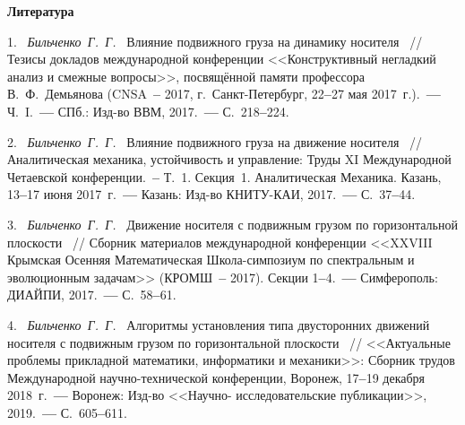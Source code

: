 \smallskip \centerline {\bf Литература} \nopagebreak



1.~%
\textit%
{Бильченко~Г.~Г.~}
{%
  {Влияние  подвижного  груза
  на  динамику  носителя}%
~/$\!$/
  Тезисы  докладов  международной  конференции
  <<Конструктивный  негладкий  анализ
  и  смежные  вопросы>>,
  посвящённой  памяти  профессора
  В.~Ф.~Демьянова
  (CNSA~{\textbf{--}}  2017,
  г.~Санкт-Петербург,
  22{\textbf{--}}27
  мая  2017~г.).~{\textbf{---}}
  Ч.~I.~{\textbf{---}}
  СПб.:  Изд-во  ВВМ,
  2017.~{\textbf{---}}
  С.~218{\textbf{--}}224.%
  }



2.~%
\textit%
{Бильченко~Г.~Г.~}
{%
  {Влияние  подвижного  груза
  на  движение  носителя}%
~/$\!$/
  Аналитическая  механика,
  устойчивость  и  управление:
  Труды  XI  Международной
  Четаевской  конференции.~{\textbf{--}}
  Т.~1.
  Секция~1.
  Аналитическая  Механика.
  Казань,
  13{\textbf{--}}17
  июня  2017~г.~{\textbf{---}}
  Казань:  Изд-во  КНИТУ-КАИ,
  2017.~{\textbf{---}}
  С.~37{\textbf{--}}44.%
  }



3.~%
\textit%
{Бильченко~Г.~Г.~}
{%
  {Движение  носителя  с  подвижным  грузом
  по  горизонтальной  плоскости}%
~/$\!$/
  Сборник  материалов  международной  конференции
  <<XXVIII  Крымская  Осенняя
  Математическая  Школа-симпозиум
  по  спектральным  и  эволюционным  задачам>>
  (КРОМШ~{\textbf{--}} 2017).
  Секции
  1{\textbf{--}}4.~{\textbf{---}}
  Симферополь:  ДИАЙПИ,
  2017.~{\textbf{---}}
  С.~58{\textbf{--}}61.%
  }



4.~%
\textit%
{Бильченко~Г.~Г.~}
{%
  {Алгоритмы
  установления  типа
  двусторонних  движений  носителя
  с  подвижным  грузом
  по  горизонтальной  плоскости}%
~/$\!$/
  <<Актуальные  проблемы
  прикладной  математики,  информатики
  и  механики>>:
  Сборник  трудов  Международной
  научно-технической  конференции,
  Воронеж,
  17{\textbf{--}}19
  декабря  2018~г.~{\textbf{---}}
  Воронеж:
  Изд-во
  <<Научно-%
  ис\-сле\-до\-ва\-тель\-ские
  публикации>>,
  2019.~{\textbf{---}}
  С.~605{\textbf{--}}611.%
  }



